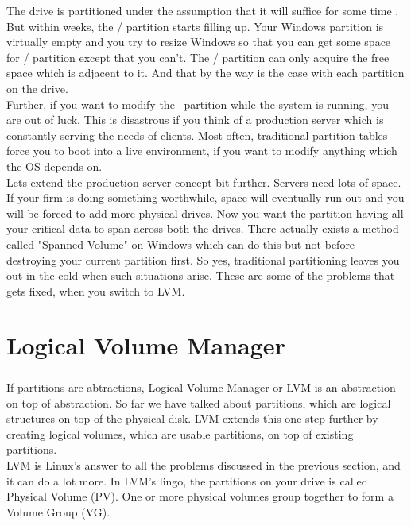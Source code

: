 The drive is partitioned under the assumption that it will suffice for some time
. But within weeks, the / partition starts filling up. Your Windows partition
is virtually empty and you try to resize Windows so that you can get some space
for / partition except that you can't. The / partition can only acquire the
free space which is adjacent to it. And that by the way is the case with each
partition on the drive.\\

Further, if you want to modify the \ partition while the system is running, you
are out of luck. This is disastrous if you think of a production server which is
constantly serving the needs of clients. Most often, traditional partition
tables force you to boot into a live environment, if you want to modify anything
which the OS depends on.\\

Lets extend the production server concept bit further. Servers need lots of
space. If your firm is doing something worthwhile, space will eventually run out
and you will be forced to add more physical drives. Now you want the partition
having all your critical data to span across both the drives. There actually
exists a method called "Spanned Volume" on Windows which can do this but not
before destroying your current partition first. So yes, traditional partitioning
leaves you out in the cold when such situations arise. These are some of the
problems that gets fixed, when you switch to LVM.


\chapter{Logical Volume Manager}
\paragraph{}
If partitions are abtractions, Logical Volume Manager or LVM is an abstraction
on top of abstraction. So far we have talked about partitions, which are
logical structures on top of the physical disk. LVM extends this one step
further by creating logical volumes, which are usable partitions, on top of
existing partitions.\\

LVM is Linux's answer to all the problems discussed in the previous section, and
it can do a lot more. In LVM's lingo, the partitions on your drive is called
Physical Volume (PV). One or more physical volumes group together to form a
Volume Group (VG).
